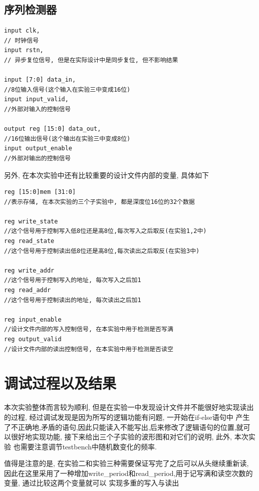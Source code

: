 \documentclass[fontset=windows,12pt]{article}
\begin{document}
    \subsection{序列检测器}
        {\setmainfont{Courier New Bold}                               
        \begin{lstlisting}
input clk,  
// 时钟信号
input rstn,     
// 异步复位信号, 但是在实际设计中是同步复位, 但不影响结果

input [7:0] data_in,    
//8位输入信号(这个输入在实验三中变成16位)
input input_valid,  
//外部对输入的控制信号

output reg [15:0] data_out,     
//16位输出信号(这个输出在实验三中变成8位)
input output_enable     
//外部对输出的控制信号
        \end{lstlisting}}
    另外, 在本次实验中还有比较重要的设计文件内部的变量, 具体如下
    {\setmainfont{Courier New Bold}                               
    \begin{lstlisting}
reg [15:0]mem [31:0]    
//表示存储, 在本次实验的三个子实验中, 都是深度位16位的32个数据

reg write_state     
//这个信号用于控制写入低8位还是高8位,每次写入之后取反(在实验1,2中)
reg read_state      
//这个信号用于控制读出低8位还是高8位,每次读出之后取反(在实验3中)

reg write_addr      
//这个信号用于控制写入的地址, 每次写入之后加1
reg read_addr       
//这个信号用于控制读出的地址, 每次读出之后加1

reg input_enable    
//设计文件内部的写入控制信号, 在本实验中用于检测是否写满
reg output_valid    
//设计文件内部的读出控制信号, 在本实验中用于检测是否读空
    \end{lstlisting}}
    
    
   \newpage


\section{调试过程以及结果}
本次实验整体而言较为顺利, 但是在实验一中发现设计文件并不能很好地实现读出的过程, 经过调试发现是因为所写的逻辑功能有问题, 一开始在if-else语句中
产生了不正确地,矛盾的语句,因此只能读入不能写出,后来修改了逻辑语句的位置,就可以很好地实现功能, 接下来给出三个子实验的波形图和对它们的说明, 此外, 本次实验
也需要注意调节testbench中随机数变化的频率.\par
值得是注意的是, 在实验二和实验三种需要保证写完了之后可以从头继续重新读, 因此在这里采用了一种增加write\_period和read\_period,用于记写满和读空次数的变量, 通过比较这两个变量就可以
实现多重的写入与读出
\end{document}
